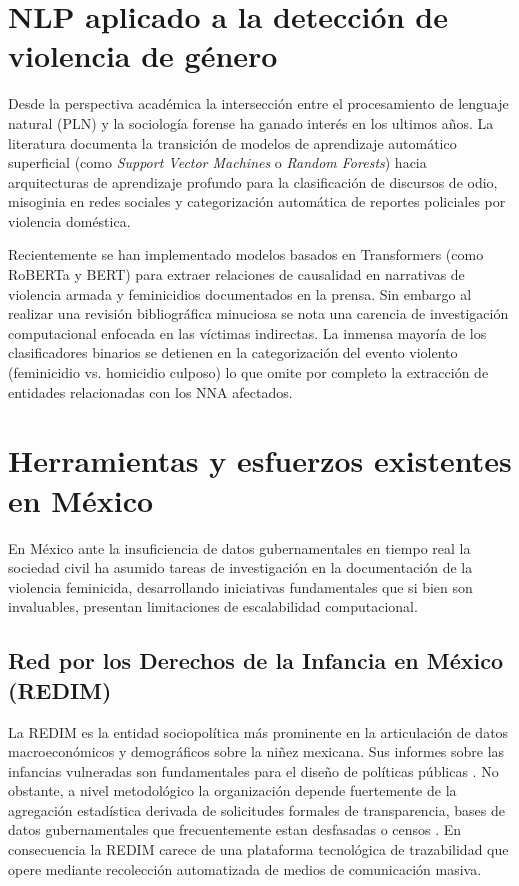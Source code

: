\section{NLP aplicado a la detección de violencia de género}
\label{sec:ea_nlp_violencia}

Desde la perspectiva académica la intersección entre el procesamiento de lenguaje natural (PLN) y
la sociología forense ha ganado interés en los ultimos años. La literatura documenta la
transición de modelos de aprendizaje automático superficial (como \textit{Support Vector Machines}
o \textit{Random Forests}) hacia arquitecturas de aprendizaje profundo para la
clasificación de discursos de odio, misoginia en redes sociales y categorización automática de reportes
policiales por violencia doméstica.

Recientemente se han implementado modelos basados en Transformers (como RoBERTa y BERT) para extraer
relaciones de causalidad en narrativas de violencia armada y feminicidios documentados en la prensa.
Sin embargo al realizar una revisión bibliográfica minuciosa se nota una carencia de investigación
computacional enfocada en las víctimas indirectas. La inmensa mayoría de los clasificadores binarios
se detienen en la categorización del evento violento (feminicidio vs. homicidio culposo) lo que omite
por completo la extracción de entidades relacionadas con los NNA afectados.

\section{Herramientas y esfuerzos existentes en México}
\label{sec:ea_esfuerzos_mexico}

En México ante la insuficiencia de datos gubernamentales en tiempo real la sociedad civil ha
asumido tareas de investigación en la documentación de la violencia feminicida, desarrollando
iniciativas fundamentales que si bien son invaluables, presentan limitaciones de escalabilidad
computacional.

\subsection{Red por los Derechos de la Infancia en México (REDIM)}
La REDIM es la entidad sociopolítica más prominente en la articulación de datos macroeconómicos y
demográficos sobre la niñez mexicana. Sus informes sobre las infancias vulneradas son
fundamentales para el diseño de políticas públicas \cite{redim2023informe}. No obstante, a nivel
metodológico la organización depende fuertemente de la agregación estadística derivada de
solicitudes formales de transparencia, bases de datos gubernamentales que frecuentemente estan
desfasadas o censos . En consecuencia la REDIM carece de una plataforma tecnológica de
trazabilidad que opere mediante recolección automatizada de medios de comunicación masiva.

